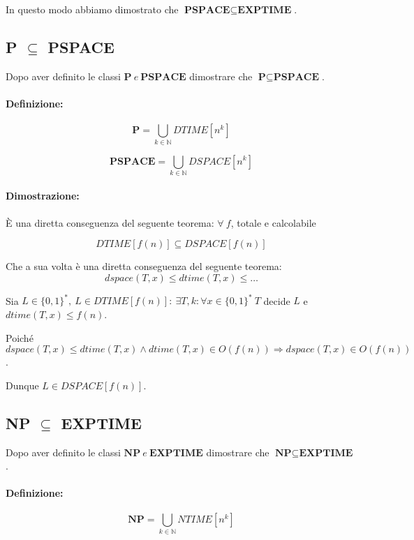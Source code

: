 In questo modo abbiamo dimostrato che $\textbf{PSPACE} \subseteq \textbf{EXPTIME}$.

\subsection{\textbf{P} $\subseteq$ \textbf{PSPACE}}

Dopo aver definito le classi $\textbf{P}\ e\ \textbf{PSPACE}$ dimostrare che $\textbf{P} \subseteq \textbf{PSPACE}$.

\paragraph*{Definizione:} 

\[
   \textbf{P} = \bigcup_{k\in \mathbb{N}} DTIME[n^k]
\]

\[
    \textbf{PSPACE} = \bigcup_{k\in \mathbb{N}} DSPACE[n^k]
\]

\paragraph*{Dimostrazione:} È una diretta conseguenza del seguente teorema: $\forall\ f$, totale e calcolabile

$$DTIME[f(n)] \subseteq DSPACE[f(n)]$$ 

Che a sua volta è una diretta conseguenza del seguente teorema:
$$dspace(T, x) \leq dtime(T, x)\leq \dots$$

Sia $L \in \{0, 1\}^*,\ L \in DTIME[f(n)]:\ \exists T, k: \forall x \in \{0, 1\}^*\ T$ decide $L$ e $dtime(T, x) \leq f(n)$.

Poiché $dspace(T, x) \leq dtime(T, x) \land dtime(T, x) \in O(f(n)) \Rightarrow dspace(T,x) \in O(f(n))$.

Dunque $L \in DSPACE[f(n)]$.

\newpage

\subsection{\textbf{NP} $\subseteq$ \textbf{EXPTIME}}

Dopo aver definito le classi $\textbf{NP}\ e\ \textbf{EXPTIME}$ dimostrare che $\textbf{NP} \subseteq \textbf{EXPTIME}$.

\paragraph*{Definizione:} 

\[
   \textbf{NP} = \bigcup_{k\in \mathbb{N}} NTIME[n^k]
\]

